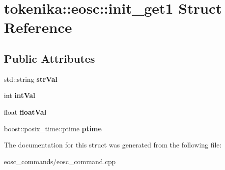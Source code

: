 \hypertarget{structtokenika_1_1eosc_1_1init__get1}{}\section{tokenika\+:\+:eosc\+:\+:init\+\_\+get1 Struct Reference}
\label{structtokenika_1_1eosc_1_1init__get1}
\subsection*{Public Attributes}
\begin{DoxyCompactItemize}
\item 
\mbox{\label{structtokenika_1_1eosc_1_1init__get1_a16f6c66fce8c542e8523b10148ddc835}} 
std\+::string {\bfseries str\+Val}
\item 
\mbox{\label{structtokenika_1_1eosc_1_1init__get1_a3bbaa7577047893fea408af7bc26d3a6}} 
int {\bfseries int\+Val}
\item 
\mbox{\label{structtokenika_1_1eosc_1_1init__get1_a51a3770c50aebba378d7068951ecfe62}} 
float {\bfseries float\+Val}
\item 
\mbox{\label{structtokenika_1_1eosc_1_1init__get1_a0f3e1707874a60d3b60bfc8809d5fe6f}} 
boost\+::posix\+\_\+time\+::ptime {\bfseries ptime}
\end{DoxyCompactItemize}


The documentation for this struct was generated from the following file\+:\begin{DoxyCompactItemize}
\item 
eosc\+\_\+commands/eosc\+\_\+command.\+cpp\end{DoxyCompactItemize}
